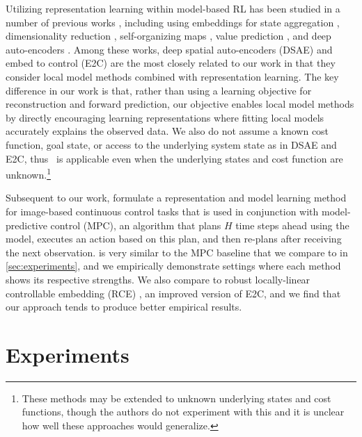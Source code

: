 Utilizing representation learning within model-based RL has been studied in a number of previous works \citep{srl-survey}, including using embeddings for state aggregation \citep{soft-state-aggregation}, dimensionality reduction \citep{dimension-reduction}, self-organizing maps \citep{self-organizing-map}, value prediction \citep{vpn}, and deep auto-encoders \citep{ae-nn,darla}. Among these works, deep spatial auto-encoders (DSAE) \citep{spatial-ae} and embed to control (E2C) \citep{e2c,rce} are the most closely related to our work in that they consider local model methods combined with representation learning. The key difference in our work is that, rather than using a learning objective for reconstruction and forward prediction, our objective enables local model methods by directly encouraging learning representations where fitting local models accurately explains the observed data. We also do not assume a known cost function, goal state, or access to the underlying system state as in DSAE and E2C, thus \metabbr\ is applicable even when the underlying states and cost function are unknown.\footnote{These methods may be extended to unknown underlying states and cost functions, though the authors do not experiment with this and it is unclear how well these approaches would generalize.}

Subsequent to our work, \citet{planet} formulate a representation and model learning method for image-based continuous control tasks that is used in conjunction with model-predictive control (MPC), an algorithm that plans $H$ time steps ahead using the model, executes an action based on this plan, and then re-plans after receiving the next observation. \citet{planet} is very similar to the MPC baseline that we compare to in \autoref{sec:experiments}, and we empirically demonstrate settings where each method shows its respective strengths. We also compare to robust locally-linear controllable embedding (RCE) \citep{rce}, an improved version of E2C, and we find that our approach tends to produce better empirical results.


\section{Experiments}
\label{sec:experiments}

